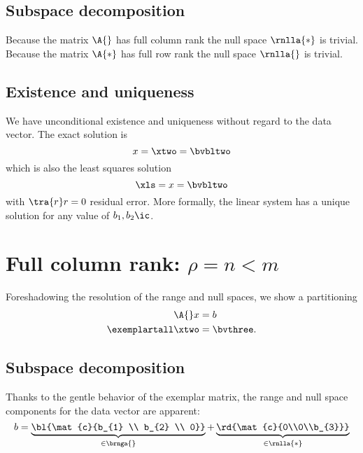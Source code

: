 \subsection{Subspace decomposition}
Because the matrix $\A{}$ has full column rank the null space $\rnlla{*}$ is trivial. Because the matrix $\A{*}$ has full row rank the null space $\rnlla{}$ is trivial.\\

\subsection{Existence and uniqueness}
We have unconditional existence and uniqueness without regard to the data vector. The exact solution is 
  \begin{equation}
    x = \xtwo = \bvbltwo
  \end{equation}
which is also the least squares solution
  \begin{equation}
    \xls = x = \bvbltwo
  \end{equation}
with $\tra{r}r = 0$ residual error. More formally, the linear system has a unique solution for any value of $b_{1}, b_{2} \ic$.


\section{Full column rank: $\rho = n < m$}
Foreshadowing the resolution of the range and null spaces, we show a partitioning
  \begin{equation}
    \begin{split}
      \A{} x &= b \\
      \exemplartall \xtwo &= \bvthree.
    \label{eqn:fcr}
    \end{split}
  \end{equation}

\subsection{Subspace decomposition}
\ftola
Thanks to the gentle behavior of the exemplar matrix, the range and null space components for the data vector are apparent:
  \begin{equation}
      b = \underbrace{\bl{\mat{c}{b_{1} \\ b_{2} \\ 0}}}_{\in\brnga{}} + \underbrace{\rd{\mat{c}{0\\0\\b_{3}}}}_{\in\rnlla{*}}
  \end{equation}

